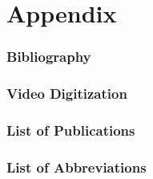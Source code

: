 \documentclass[12pt,a4paper,twoside]{report}
\newcommand\cleartorightpage{%
\clearpage
\hbox{}
}
\begin{document}
\cleartorightpage
\part{Appendix}\label{acknowledgements}


\singlespacing
\section{Bibliography}
\renewcommand{\bibname}{}
\makeatletter
\renewcommand{\chapter}{\@gobbletwo}
\makeatother



\clearpage
\section{Video Digitization}\label{cpt:digitization}


\clearpage
\section{List of Publications}\label{cpt:publications}



\clearpage
\section{List of Abbreviations}\label{abbreviations}
\begin{spacing}{1.5}

\end{spacing}
\end{document}
